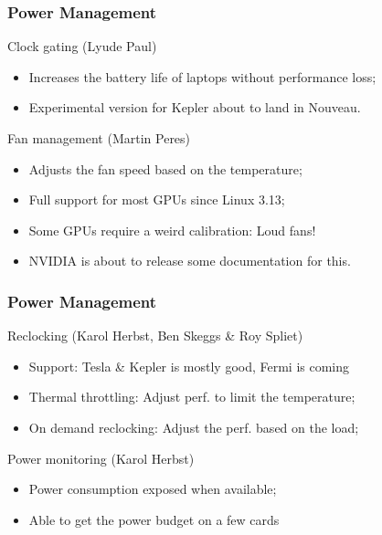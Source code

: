 \documentclass[11pt,english,compress]{beamer}
\begin{document}
\begin{frame}
	\frametitle{Power Management}

	\begin{block}{Clock gating (Lyude Paul)}
		\begin{itemize}
			\item Increases the battery life of laptops without performance loss;
			\item Experimental version for Kepler about to land in Nouveau.
		\end{itemize}
	\end{block}

	\begin{block}{Fan management (Martin Peres)}
		\begin{itemize}
			\item Adjusts the fan speed based on the temperature;
			\item Full support for most GPUs since Linux 3.13;
			\item Some GPUs require a weird calibration: Loud fans!
			\item NVIDIA is about to release some documentation for this.
		\end{itemize}
	\end{block}
\end{frame}

\begin{frame}
	\frametitle{Power Management}

	\begin{block}{Reclocking (Karol Herbst, Ben Skeggs \& Roy Spliet)}
		\begin{itemize}
			\item Support: Tesla \& Kepler is mostly good, Fermi is coming
			\item Thermal throttling: Adjust perf. to limit the temperature;
			\item On demand reclocking: Adjust the perf. based on the load;
		\end{itemize}
	\end{block}

	\begin{block}{Power monitoring (Karol Herbst)}
		\begin{itemize}
			\item Power consumption exposed when available;
			\item Able to get the power budget on a few cards
		\end{itemize}
	\end{block}
\end{frame}
\end{document}
